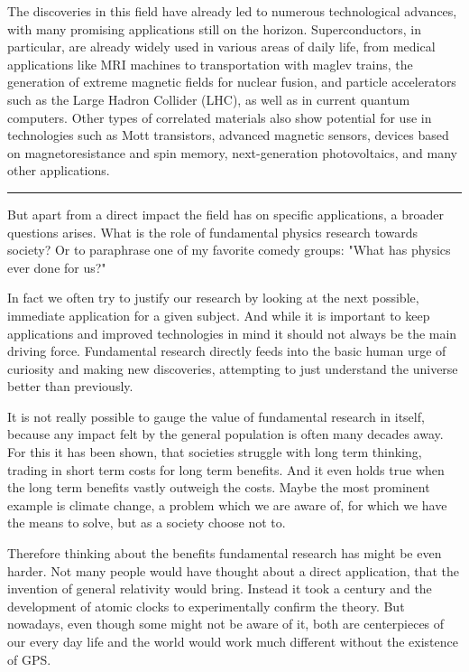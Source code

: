 The discoveries in this field have already led to numerous technological advances, with many promising applications still on the horizon.
Superconductors, in particular, are already widely used in various areas of daily life, from medical applications like MRI machines to transportation with maglev trains, the generation of extreme magnetic fields for nuclear fusion, and particle accelerators such as the Large Hadron Collider (LHC), as well as in current quantum computers.
Other types of correlated materials also show potential for use in technologies such as Mott transistors, advanced magnetic sensors, devices based on magnetoresistance and spin memory, next-generation photovoltaics, and many other applications.

\begin{center}
	\rule{0.3\textwidth}{.8pt}
\end{center}

But apart from a direct impact the field has on specific applications, a broader questions arises.
What is the role of fundamental physics research towards society?
Or to paraphrase one of my favorite comedy groups: "What has physics ever done for us?"

In fact we often try to justify our research by looking at the next possible, immediate application for a given subject.
And while it is important to keep applications and improved technologies in mind it should not always be the main driving force.
Fundamental research directly feeds into the basic human urge of curiosity and making new discoveries, attempting to just understand the universe better than previously.

It is not really possible to gauge the value of fundamental research in itself, because any impact felt by the general population is often many decades away.
For this it has been shown, that societies struggle with long term thinking, trading in short term costs for long term benefits.
And it even holds true when the long term benefits vastly outweigh the costs.
Maybe the most prominent example is climate change, a problem which we are aware of, for which we have the means to solve, but as a society choose not to.

Therefore thinking about the benefits fundamental research has might be even harder.
Not many people would have thought about a direct application, that the invention of general relativity would bring.
Instead it took a century and the development of atomic clocks to experimentally confirm the theory.
But nowadays, even though some might not be aware of it, both are centerpieces of our every day life and the world would work much different without the existence of GPS.

